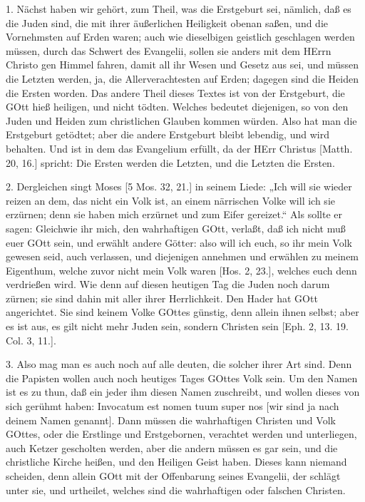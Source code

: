 1. Nächst haben wir gehört, zum Theil, was die Erstgeburt sei, nämlich, daß es die Juden sind, die mit ihrer äußerlichen Heiligkeit obenan saßen, und die Vornehmsten auf Erden waren; auch wie dieselbigen geistlich geschlagen werden müssen, durch das Schwert des Evangelii, sollen sie anders mit dem HErrn Christo gen Himmel fahren, damit all ihr Wesen und Gesetz aus sei, und müssen die Letzten werden, ja, die Allerverachtesten auf Erden; dagegen sind die Heiden die Ersten worden. Das andere Theil dieses Textes ist von der Erstgeburt, die GOtt hieß heiligen, und nicht tödten. Welches bedeutet diejenigen, so von den Juden und Heiden zum christlichen Glauben kommen würden. Also hat man die Erstgeburt getödtet; aber die andere Erstgeburt bleibt lebendig, und wird behalten. Und ist in dem das Evangelium erfüllt, da der HErr Christus [Matth. 20, 16.] spricht: Die Ersten werden die Letzten, und die Letzten die Ersten.

2. Dergleichen singt Moses [5 Mos. 32, 21.] in seinem Liede: „Ich will sie wieder reizen an dem, das nicht ein Volk ist, an einem närrischen Volke will ich sie erzürnen; denn sie haben mich erzürnet und zum Eifer gereizet.“ Als sollte er sagen: Gleichwie ihr mich, den wahrhaftigen GOtt, verlaßt, daß ich nicht muß euer GOtt sein, und erwählt andere Götter: also will ich euch, so ihr mein Volk gewesen seid, auch verlassen, und diejenigen annehmen und erwählen zu meinem Eigenthum, welche zuvor nicht mein Volk waren [Hos. 2, 23.], welches euch denn verdrießen wird. Wie denn auf diesen heutigen Tag die Juden noch darum zürnen; sie sind dahin mit aller ihrer Herrlichkeit. Den Hader hat GOtt angerichtet. Sie sind keinem Volke GOttes günstig, denn allein ihnen selbst; aber es ist aus, es gilt nicht mehr Juden sein, sondern Christen sein [Eph. 2, 13. 19. Col. 3, 11.].

3. Also mag man es auch noch auf alle deuten, die solcher ihrer Art sind. Denn die Papisten wollen auch noch heutiges Tages GOttes Volk sein. Um den Namen ist es zu thun, daß ein jeder ihm diesen Namen zuschreibt, und wollen dieses von sich gerühmt haben: Invocatum est nomen tuum super nos [wir sind ja nach deinem Namen genannt]. Dann müssen die wahrhaftigen Christen und Volk GOttes, oder die Erstlinge und Erstgebornen, verachtet werden und unterliegen, auch Ketzer gescholten werden, aber die andern müssen es gar sein, und die christliche Kirche heißen, und den Heiligen Geist haben. Dieses kann niemand scheiden, denn allein GOtt mit der Offenbarung seines Evangelii, der schlägt unter sie, und urtheilet, welches sind die wahrhaftigen oder falschen Christen.

